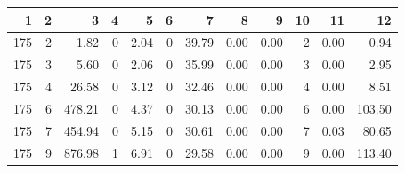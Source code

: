 \begin{tabular}{rrrrrrrrrrrr}
\toprule
1 & 2 & 3 & 4 & 5 & 6 & 7 & 8 & 9 & 10 & 11 & 12 \\
\midrule
175 & 2 & 1.82 & 0 & 2.04 & 0 & 39.79 & 0.00 & 0.00 & 2 & 0.00 & 0.94 \\
175 & 3 & 5.60 & 0 & 2.06 & 0 & 35.99 & 0.00 & 0.00 & 3 & 0.00 & 2.95 \\
175 & 4 & 26.58 & 0 & 3.12 & 0 & 32.46 & 0.00 & 0.00 & 4 & 0.00 & 8.51 \\
175 & 6 & 478.21 & 0 & 4.37 & 0 & 30.13 & 0.00 & 0.00 & 6 & 0.00 & 103.50 \\
175 & 7 & 454.94 & 0 & 5.15 & 0 & 30.61 & 0.00 & 0.00 & 7 & 0.03 & 80.65 \\
175 & 9 & 876.98 & 1 & 6.91 & 0 & 29.58 & 0.00 & 0.00 & 9 & 0.00 & 113.40 \\
\bottomrule
\end{tabular}
